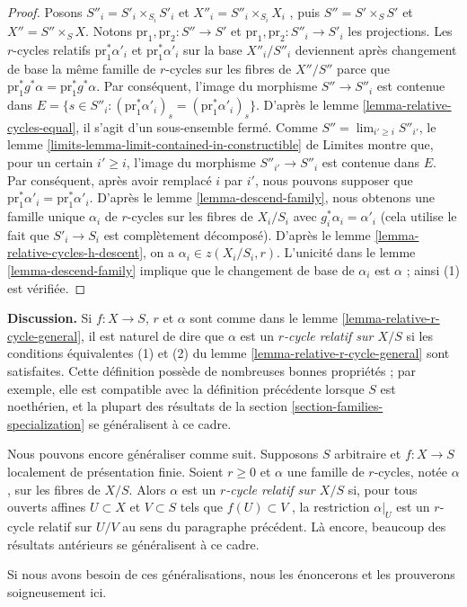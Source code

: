 \begin{proof}
\medskip\noindent
 Posons $S''_i = S'_i \times_{S_i} S'_i$ et $X''_i = S''_i \times_{S_i} X_i$
 , puis $S'' = S' \times_S S'$ et $X'' = S'' \times_S X$.
 Notons $\text{pr}_1, \text{pr}_2 : S'' \to S'$ et 
$\text{pr}_1, \text{pr}_2 : S''_i \to S'_i$ les projections.
 Les $r$-cycles relatifs  $\text{pr}_1^*\alpha'_i$  et  $\text{pr}_1^*\alpha'_i$
  sur la base  $X''_i/S''_i$ deviennent après changement de base la même famille de $r$-cycles 
sur les fibres de $X''/S''$  parce que  
$\text{pr}_1^*g^*\alpha = \text{pr}_1^*g^*\alpha$. 
Par conséquent, l'image du morphisme $S'' \to S''_i$ est contenue dans $E =
\{s \in S''_i : (\text{pr}_1^*\alpha'_i)_s = (\text{pr}_1^*\alpha'_i)_s\}$. 
D'après le lemme \ref{lemma-relative-cycles-equal}, il s'agit d'un sous-ensemble fermé.
 Comme $S'' = \lim_{i' \geq i} S''_{i'}$, le 
lemme 
\ref{limits-lemma-limit-contained-in-constructible} de Limites montre 
que, pour un certain $i' \geq i$, l'image du morphisme $S''_{i'} \to S''_i$
 est contenue dans $E$. Par conséquent, après avoir remplacé  $i$  par  $i'$, nous pouvons supposer que 
$\text{pr}_1^*\alpha'_i = \text{pr}_1^*\alpha'_i$. 
D'après le lemme \ref{lemma-descend-family}, nous
 obtenons une famille unique  $\alpha_i$
  de  $r$-cycles sur les fibres de  $X_i/S_i$
 avec  $g_i^*\alpha_i = \alpha'_i$  (cela utilise le fait que  $S'_i \to S_i$
  est complètement décomposé). D'après
 le lemme \ref{lemma-relative-cycles-h-descent},
 on a $\alpha_i \in z(X_i/S_i, r)$.
 L'unicité dans le lemme \ref{lemma-descend-family} implique que le 
changement de base de $\alpha_i$ est $\alpha$ ; ainsi (1) est vérifiée. 
\end{proof} 

\noindent
 {\bf Discussion.} 
Si $f : X \to S$, $r$ et $\alpha$ sont comme dans
 le lemme \ref{lemma-relative-r-cycle-general}, il est naturel de 
dire que $\alpha$ est un {\it $r$-cycle relatif sur $X/S$} si
 les conditions équivalentes
 (1) et (2) du lemme \ref{lemma-relative-r-cycle-general} sont satisfaites.
 Cette définition possède de nombreuses bonnes propriétés ; par 
exemple, elle est compatible avec la définition précédente lorsque $S$
 est noethérien, et la plupart des résultats de 
la section \ref{section-families-specialization} se généralisent
 à ce cadre. 

\medskip\noindent
 Nous pouvons encore généraliser comme suit. 
Supposons $S$ arbitraire et $f : X \to S$ localement de présentation finie. 
Soient $r \geq 0$ et $\alpha$ une famille de $r$-cycles, notée $\alpha$, sur les fibres de 
$X/S$. Alors $\alpha$ est un {\it $r$-cycle relatif sur $X/S$} si, pour tous 
ouverts affines $U \subset X$ et $V \subset S$ tels que $f(U) \subset V$
 , la restriction $\alpha|_U$ est un $r$-cycle relatif sur $U/V$ au
 sens du paragraphe précédent. Là encore, beaucoup des résultats antérieurs
 se généralisent à ce cadre. 

\medskip\noindent
 Si nous avons besoin de ces généralisations, nous les énoncerons et les prouverons 
soigneusement ici. 



















 

 
 

 
